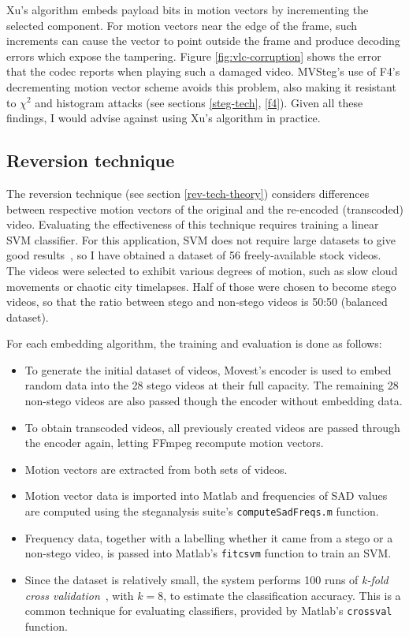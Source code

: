 \documentclass[12pt,british,twoside,notitlepage,usenames,dvipsnames,hypens,final]{report}
\numberwithin{equation}{section}
\numberwithin{figure}{section}
\begin{document}
Xu's algorithm embeds payload bits in motion vectors by incrementing the selected component. For motion vectors near the edge of the frame, such increments can cause the vector to point outside the frame and produce decoding errors which expose the tampering. Figure \ref{fig:vlc-corruption} shows the error that the codec reports when playing such a damaged video. MVSteg's use of F4's decrementing motion vector scheme avoids this problem, also making it resistant to $\chi^2$ and histogram attacks (see sections \ref{steg-tech}, \ref{f4}). Given all these findings, I would advise against using Xu's algorithm in practice.

\subsection{Reversion technique}
\label{rev-tech}

The reversion technique (see section \ref{rev-tech-theory}) considers differences between respective motion vectors of the original and the re-encoded (transcoded) video. Evaluating the effectiveness of this technique requires training a linear SVM classifier. For this application, SVM does not require large datasets to give good results~\cite{cao2012video}, so I have obtained a dataset of 56 freely-available stock videos. The videos were selected to exhibit various degrees of motion, such as slow cloud movements or chaotic city timelapses. Half of those were chosen to become stego videos, so that the ratio between stego and non-stego videos is 50:50 (balanced dataset).

For each embedding algorithm, the training and evaluation is done as follows:
\begin{itemize}
\item To generate the initial dataset of videos, Movest's encoder is used to embed random data into the 28 stego videos at their full capacity. The remaining 28 non-stego videos are also passed though the encoder without embedding data.
\item To obtain transcoded videos, all previously created videos are passed through the encoder again, letting FFmpeg recompute motion vectors.
\item Motion vectors are extracted from both sets of videos.
\item Motion vector data is imported into Matlab and frequencies of SAD values are computed using the steganalysis suite's \texttt{computeSadFreqs.m} function.
\item Frequency data, together with a labelling whether it came from a stego or a non-stego video, is passed into Matlab's \texttt{fitcsvm} function to train an SVM.
\item Since the dataset is relatively small, the system performs 100 runs of \emph{k-fold cross validation}~\cite{ai2-notes}, with $k = 8$, to estimate the classification accuracy. This is a common technique for evaluating classifiers, provided by Matlab's \texttt{crossval} function.

\end{itemize}
\end{document}
